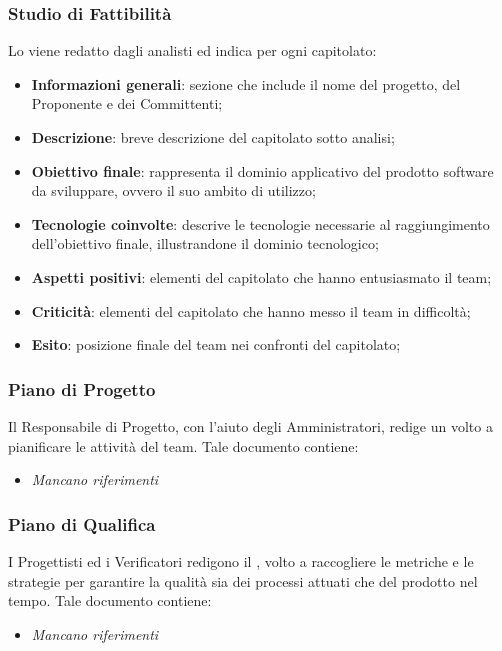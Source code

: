        \subsubsection{Studio di Fattibilità}
        Lo \SdF{} viene redatto dagli analisti ed indica per ogni capitolato:
        \begin{itemize}
            \item{\textbf{Informazioni generali}: sezione che include il nome del progetto, del Proponente e dei Committenti;}
            \item{\textbf{Descrizione}: breve descrizione del capitolato sotto analisi;}
            \item{\textbf{Obiettivo finale}: rappresenta il dominio applicativo del prodotto software da sviluppare, ovvero il suo ambito di utilizzo;}
            \item{\textbf{Tecnologie coinvolte}: descrive le tecnologie necessarie al raggiungimento dell'obiettivo finale, illustrandone il dominio tecnologico;}
            \item{\textbf{Aspetti positivi}: elementi del capitolato che hanno entusiasmato il team;}
            \item{\textbf{Criticità}: elementi del capitolato che hanno messo il team in difficoltà;}
            \item{\textbf{Esito}: posizione finale del team nei confronti del capitolato;}
        \end{itemize}
        
        \subsubsection{Piano di Progetto}
        Il Responsabile di Progetto, con l'aiuto degli Amministratori, redige un \PdP{} volto a pianificare le attività del team. Tale documento contiene:
        \begin{itemize}
        		\item{\textit{Mancano riferimenti}}
        \end{itemize}
        
        \subsubsection{Piano di Qualifica}
        I Progettisti ed i Verificatori redigono il \PdQ{}, volto a raccogliere le metriche e le strategie per garantire la qualità sia dei processi attuati che del prodotto nel tempo. Tale documento contiene:
        \begin{itemize}
        		\item{\textit{Mancano riferimenti}}
        \end{itemize}
        
